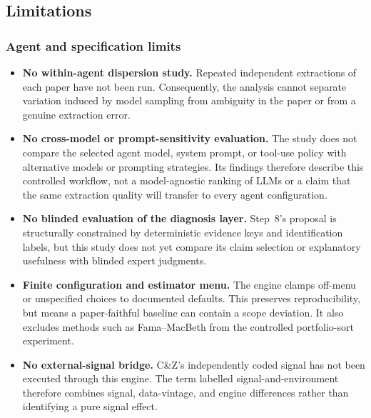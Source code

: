 \subsection{Limitations}

\subsubsection{Agent and specification limits}
\begin{itemize}
  \item \textbf{No within-agent dispersion study.} Repeated independent
    extractions of each paper have not been run. Consequently, the analysis
    cannot separate variation induced by model sampling from ambiguity in the
    paper or from a genuine extraction error.
  \item \textbf{No cross-model or prompt-sensitivity evaluation.} The study
    does not compare the selected agent model, system prompt, or tool-use
    policy with alternative models or prompting strategies. Its findings
    therefore describe this controlled workflow, not a model-agnostic ranking
    of LLMs or a claim that the same extraction quality will transfer to every
    agent configuration.
  \item \textbf{No blinded evaluation of the diagnosis layer.} Step~8's
    proposal is structurally constrained by deterministic evidence keys and
    identification labels, but this study does not yet compare its claim
    selection or explanatory usefulness with blinded expert judgments.
  \item \textbf{Finite configuration and estimator menu.} The engine clamps
    off-menu or unspecified choices to documented defaults. This preserves
    reproducibility, but means a paper-faithful baseline can contain a scope
    deviation. It also excludes methods such as Fama--MacBeth from the
    controlled portfolio-sort experiment.
  \item \textbf{No external-signal bridge.} C\&Z's independently coded
    signal has not been executed through this engine. The term labelled
    signal-and-environment therefore combines signal, data-vintage, and
    engine differences rather than identifying a pure signal effect.
\end{itemize}

